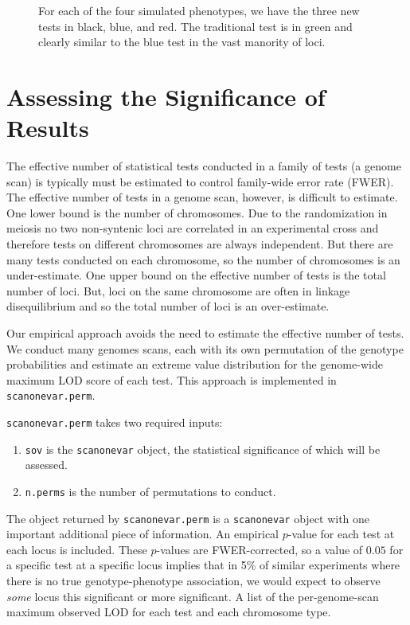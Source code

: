 \documentclass[9pt,twocolumn,twoside]{gsag3jnl}
\begin{document}
\begin{figure}
    \caption{For each of the four simulated phenotypes, we have the three new tests in black, blue, and red.  The traditional test is in green and clearly similar to the blue test in the vast manority of loci. \label{fig:lod_score_scans}}
\end{figure}



\section*{Assessing the Significance of Results}

The effective number of statistical tests conducted in a family of tests (a genome scan) is typically must be estimated to control family-wide error rate (FWER).
The effective number of tests in a genome scan, however, is difficult to estimate.
One lower bound is the number of chromosomes.
Due to the randomization in meiosis no two non-syntenic loci are correlated in an experimental cross and therefore tests on different chromosomes are always independent.
But there are many tests conducted on each chromosome, so the number of chromosomes is an under-estimate.
One upper bound on the effective number of tests is the total number of loci.
But, loci on the same chromosome are often in linkage disequilibrium and so the total number of loci is an over-estimate.

Our empirical approach avoids the need to estimate the effective number of tests.
We conduct many genomes scans, each with its own permutation of the genotype probabilities and estimate an extreme value distribution for the genome-wide maximum LOD score of each test.
This approach is implemented in \texttt{scanonevar.perm}.

\texttt{scanonevar.perm} takes two required inputs:

\begin{enumerate}
	\item \texttt{sov} is the \texttt{scanonevar} object, the statistical significance of which will be assessed.
	\item \texttt{n.perms} is the number of permutations to conduct.
\end{enumerate}

The object returned by \texttt{scanonevar.perm} is a \texttt{scanonevar} object with one important additional piece of information.
An empirical $p$-value for each test at each locus is included.
These $p$-values are FWER-corrected, so a value of $0.05$ for a specific test at a specific locus implies that in 5\% of similar experiments where there is no true genotype-phenotype association, we would expect to observe \textit{some} locus this significant or more significant.
A list of the per-genome-scan maximum observed LOD for each test and each chromosome type.
\end{document}
